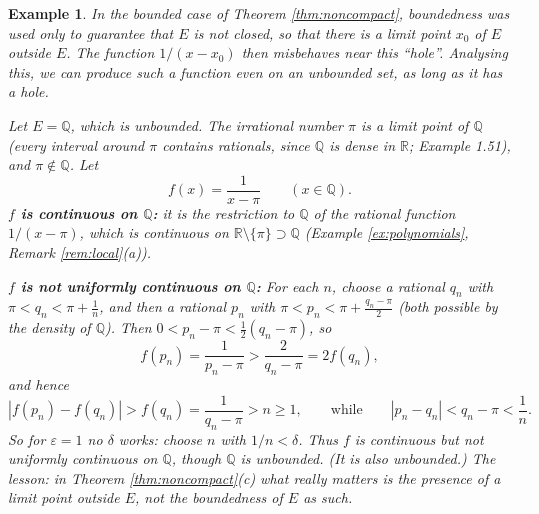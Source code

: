 \documentclass{article}
\theoremstyle{mythm}
\newtheorem{example}[theorem]{Example}
\begin{document}
\begin{example}\label{ex:Q}
In the bounded case of Theorem \ref{thm:noncompact}, boundedness was used \textit{only} to guarantee that $E$ is not closed, so that there is a limit point $x_0$ of $E$ outside $E$. The function $1/(x - x_0)$ then misbehaves near this ``hole''. Analysing this, we can produce such a function even on an unbounded set, as long as it has a hole.

Let $E = \mathbb{Q}$, which is unbounded. The irrational number $\pi$ is a limit point of $\mathbb{Q}$ (every interval around $\pi$ contains rationals, since $\mathbb{Q}$ is dense in $\mathbb{R}$; Example 1.51), and $\pi \notin \mathbb{Q}$. Let
\[
f(x) = \frac{1}{x - \pi} \qquad (x \in \mathbb{Q}).
\]
\textbf{$f$ is continuous on $\mathbb{Q}$:} it is the restriction to $\mathbb{Q}$ of the rational function $1/(x - \pi)$, which is continuous on $\mathbb{R} \setminus \{\pi\} \supset \mathbb{Q}$ (Example \ref{ex:polynomials}, Remark \ref{rem:local}(a)).

\textbf{$f$ is not uniformly continuous on $\mathbb{Q}$:} For each $n$, choose a rational $q_n$ with $\pi < q_n < \pi + \frac{1}{n}$, and then a rational $p_n$ with $\pi < p_n < \pi + \frac{q_n - \pi}{2}$ (both possible by the density of $\mathbb{Q}$). Then $0 < p_n - \pi < \frac{1}{2}(q_n - \pi)$, so
\[
f(p_n) = \frac{1}{p_n - \pi} > \frac{2}{q_n - \pi} = 2 f(q_n),
\]
and hence
\[
|f(p_n) - f(q_n)| > f(q_n) = \frac{1}{q_n - \pi} > n \geq 1, \qquad\text{while}\qquad |p_n - q_n| < q_n - \pi < \frac{1}{n}.
\]
So for $\varepsilon = 1$ no $\delta$ works: choose $n$ with $1/n < \delta$. Thus $f$ is continuous but not uniformly continuous on $\mathbb{Q}$, though $\mathbb{Q}$ is unbounded. (It is also unbounded.) The lesson: in Theorem \ref{thm:noncompact}(c) what really matters is the presence of a limit point outside $E$, not the boundedness of $E$ as such.
\end{example}
\end{document}
